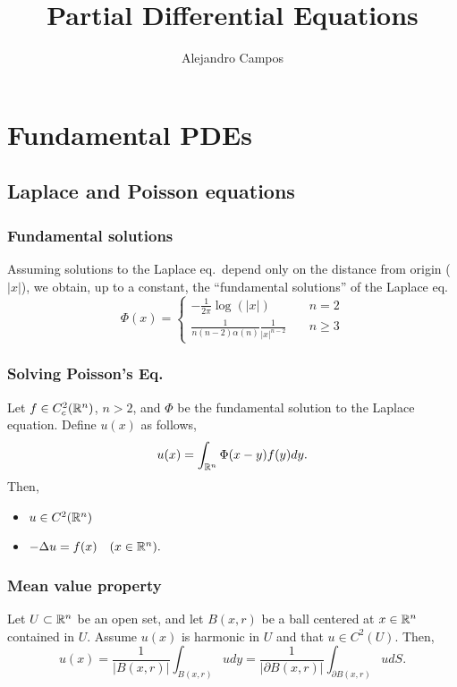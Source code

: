 \documentclass[oneside,a4paper,11pt]{report}
\title{Partial Differential Equations}
\author{Alejandro Campos}
\begin{document}
\maketitle

\chapter{Fundamental PDEs}

\section{Laplace and Poisson equations}

\subsection{Fundamental solutions}
Assuming solutions to the Laplace eq.\ depend only on the distance from origin ($|x|$), we obtain, up to a constant, the ``fundamental solutions'' of the Laplace eq.
\[
  \Phi(x) = \begin{cases}
   -\frac{1}{2\pi} \log(|x|) & \quad n = 2\\
    \frac{1}{n(n-2)\alpha(n)} \frac{1}{|x|^{n-2}} & \quad n \ge 3
 \end{cases}
\]

\subsection{Solving Poisson's Eq.}
Let $f \in C_c^2({\mathbb{R}^n})$, $n > 2$, and $\Phi$ be the fundamental solution to the Laplace equation. Define $u(x)$ as follows,
\[u(x) = \int_{{\mathbb{R}^n}}\Phi(x-y)f(y)dy. \]
Then,
\begin{itemize}
\item $u \in C^2({\mathbb{R}^n})$
\item $-\Delta u = f(x) \quad (x \in {\mathbb{R}^n}).$
\end{itemize}

\subsection{Mean value property}
 Let $U \subset {\mathbb{R}^n}$ be an open set, and let $B(x,r)$ be a ball centered at $x \in {\mathbb{R}^n}$ contained in $U$. Assume $u(x)$ is harmonic in $U$ and that $u \in C^2(U)$. Then,
\[u(x) = \frac{1}{|B(x,r)|} \int_{B(x,r)} u dy = \frac{1}{|\partial B(x,r)|} \int_{\partial B(x,r)} u dS. \] 
\end{document}
